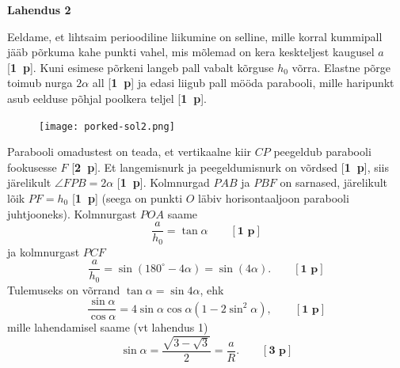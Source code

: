 \documentclass[11pt,a5paper]{article}
\newcommand{\p}[1]{[\textbf{#1~p}]}
\begin{document}
\textbf{Lahendus 2}

Eeldame, et lihtsaim perioodiline liikumine on selline, mille korral kummipall jääb põrkuma kahe punkti vahel, mis mõlemad on kera keskteljest kaugusel $a$ \p{1}. Kuni esimese põrkeni langeb pall vabalt kõrguse $h_0$ võrra. Elastne põrge toimub nurga $2\alpha$ all \p{1} ja edasi liigub pall mööda parabooli, mille haripunkt asub eelduse põhjal poolkera teljel \p{1}.

\begin{figure}
\vspace{-1.1cm}
  \begin{center}
    \texttt{[image: porked-sol2.png]}
  \end{center}
  \vspace{-0.5cm}
\end{figure}

Parabooli omadustest on teada, et vertikaalne kiir $CP$ peegeldub parabooli fookusesse $F$ \p{2}. Et langemisnurk ja peegeldumisnurk on võrdsed \p{1}, siis järelikult $\angle{FPB}=2\alpha$ \p{1}. Kolmnurgad $PAB$ ja $PBF$ on sarnased, järelikult lõik $PF=h_0$ \p{1} (seega on punkti $O$ läbiv horisontaaljoon parabooli juhtjooneks). Kolmnurgast $POA$ saame
\[\frac{a}{h_0}=\tan\alpha\qquad \p{1}\]
ja kolmnurgast $PCF$
\[\frac{a}{h_0}=\sin(180^\circ-4\alpha)=\sin(4\alpha). \qquad \p{1}\]
Tulemuseks on võrrand $\tan\alpha=\sin 4\alpha$, ehk
\[\frac{\sin\alpha}{\cos\alpha}=4\sin\alpha\cos\alpha(1-2\sin^2\alpha), \qquad \p{1}\]
mille lahendamisel saame (vt lahendus 1)
\[\sin\alpha=\frac{\sqrt{3-\sqrt{3}}}{2}=\frac{a}{R}. \qquad \p{3}\]
\end{document}
